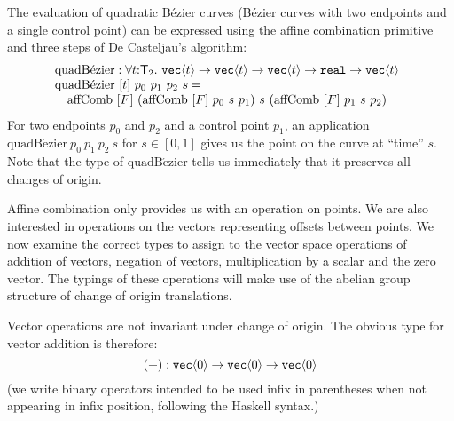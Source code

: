 \begin{example}
  The evaluation of quadratic B\'{e}zier curves (B\'{e}zier curves
  with two endpoints and a single control point) can be expressed
  using the affine combination primitive and three steps of De
  Casteljau's algorithm:
  \begin{displaymath}
    \begin{array}{@{}l}
      \mathrm{quadB\acute{e}zier} : \forall t \mathord:\SynTransl_2.\ \tyPrim{vec}{t} \to \tyPrim{vec}{t} \to \tyPrim{vec}{t} \to \tyPrimNm{real} \to \tyPrim{vec}{t} \\
      \mathrm{quadB\acute{e}zier}\ [t]\ p_0\ p_1\ p_2\ s = \\
      \quad \mathrm{affComb}\ [F]\ (\mathrm{affComb}\ [F]\ p_0\ s\ p_1)\ s\ (\mathrm{affComb}\ [F]\ p_1\ s\ p_2) \\
    \end{array}
  \end{displaymath}
  For two endpoints $p_0$ and $p_2$ and a control point $p_1$, an
  application $\mathrm{quadB\acute{e}zier}\ p_0\ p_1\ p_2\ s$ for $s
  \in [0,1]$ gives us the point on the curve at ``time'' $s$. Note
  that the type of $\mathrm{quadB\acute{e}zier}$ tells us immediately
  that it preserves all changes of origin.
\end{example}

Affine combination only provides us with an operation on points. We
are also interested in operations on the vectors representing offsets
between points. We now examine the correct types to assign to the
vector space operations of addition of vectors, negation of vectors,
multiplication by a scalar and the zero vector. The typings of these
operations will make use of the abelian group structure of change of
origin translations.

Vector operations are not invariant under change of origin. The
obvious type for vector addition is therefore:
\begin{displaymath}
  (+) : \texttt{vec}\langle 0 \rangle \to \texttt{vec}\langle 0 \rangle \to \texttt{vec}\langle 0 \rangle
\end{displaymath}
(we write binary operators intended to be used infix in parentheses
when not appearing in infix position, following the Haskell
syntax.)

